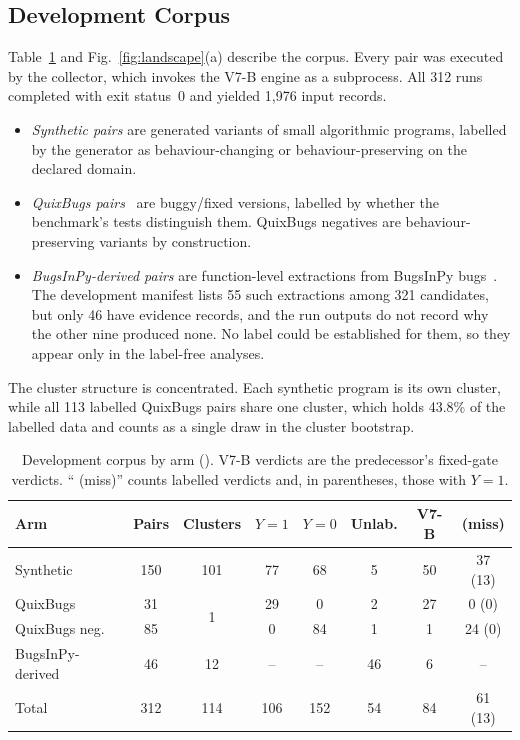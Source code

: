 \subsection{Development Corpus}
Table~\ref{tab:corpus} and Fig.~\ref{fig:landscape}(a) describe the corpus. Every pair was executed by the \sbg{} collector, which invokes the V7-B engine as a subprocess. All 312 runs completed with exit status~0 and yielded 1{,}976 input records.
\begin{itemize}
\item \emph{Synthetic pairs} are generated variants of small algorithmic programs, labelled by the generator as behaviour-changing or behaviour-preserving on the declared domain.
\item \emph{QuixBugs pairs}~\cite{lin2017quixbugs} are buggy/fixed versions, labelled by whether the benchmark's tests distinguish them. QuixBugs negatives are behaviour-preserving variants by construction.
\item \emph{BugsInPy-derived pairs} are function-level extractions from BugsInPy bugs~\cite{widyasari2020bugsinpy}. The development manifest lists 55 such extractions among 321 candidates, but only 46 have evidence records, and the run outputs do not record why the other nine produced none. No label could be established for them, so they appear only in the label-free analyses.
\end{itemize}
The cluster structure is concentrated. Each synthetic program is its own cluster, while all 113 labelled QuixBugs pairs share one cluster, which holds 43.8\% of the labelled data and counts as a single draw in the cluster bootstrap.

\begin{table}[!t]
\caption{Development corpus by arm (). V7-B verdicts are the predecessor's fixed-gate verdicts. ``\NDO{} (miss)'' counts labelled \NDO{} verdicts and, in parentheses, those with $Y{=}1$.}
\label{tab:corpus}
\centering
\scriptsize
\setlength{\tabcolsep}{2.5pt}
\begin{tabular}{|l|c|c|c|c|c|c|c|}
\hline
Arm & Pairs & Clusters & $Y{=}1$ & $Y{=}0$ & Unlab. & V7-B \DIV{} & \NDO{} (miss) \\
\hline
Synthetic & 150 & 101 & 77 & 68 & 5 & 50 & 37 (13) \\
QuixBugs & 31 & \multirow{2}{*}{1} & 29 & 0 & 2 & 27 & 0 (0) \\
QuixBugs neg. & 85 & & 0 & 84 & 1 & 1 & 24 (0) \\
BugsInPy-derived & 46 & 12 & -- & -- & 46 & 6 & -- \\
\hline
Total & 312 & 114 & 106 & 152 & 54 & 84 & 61 (13) \\
\hline
\end{tabular}
\end{table}

